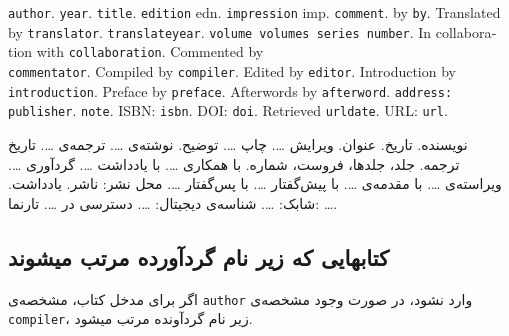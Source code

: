 \documentclass[a4paper,11pt]{article}
\begin{document}
\begin{itemize}[nosep]
\begin{latin}
\item[] []
{\tt author}. {\tt year}. {\tt title}. {\tt edition} edn. {\tt impression} imp. {\tt comment}. by {\tt by}. Translated by {\tt translator}. {\tt translateyear}. {\tt volume volumes series number}. In collaboration with {\tt collaboration}. Commented by \\{\tt commentator}. Compiled by {\tt compiler}. Edited by {\tt editor}. Introduction by {\tt introduction}. Preface by {\tt preface}. Afterwords by {\tt afterword}. {\tt address: publisher}. {\tt note}. ISBN: {\tt isbn}. DOI: {\tt doi}. Retrieved {\tt urldate}. URL: {\tt url}. 
\end{latin}

\item[] []
{\persianttfamily نویسنده}. {\persianttfamily تاریخ}. {\persianttfamily عنوان}. ویرایش {\persianttfamily …}. چاپ {\persianttfamily …}. {\persianttfamily توضیح}. نوشته‌ی {\persianttfamily …}. ترجمه‌ی {\persianttfamily …}. {\persianttfamily تاریخ ترجمه}. {\persianttfamily جلد، جلدها، فروست، شماره}. با همکاری {\persianttfamily …}. با یادداشت {\persianttfamily …}. گردآوری {\persianttfamily …}. ویراسته‌ی {\persianttfamily …}. با مقدمه‌ی {\persianttfamily …}. با پیش‌گفتار {\persianttfamily …}. با پس‌گفتار {\persianttfamily …}. {\persianttfamily محل نشر: ناشر}. {\persianttfamily یادداشت}. شابک: {\persianttfamily …}. شناسه‌ی دیجیتال: {\persianttfamily …}. دسترسی در {\persianttfamily …}. تارنما: {\persianttfamily …}. 
\end{itemize}





\subsection{کتابهایی که زیر نام گردآورده مرتب میشوند}
اگر برای مدخل کتاب، مشخصه‌ی \verb|author| وارد نشود، در صورت وجود مشخصه‌ی \verb|compiler|، زیر نام گردآونده مرتب میشود.
\end{document}
